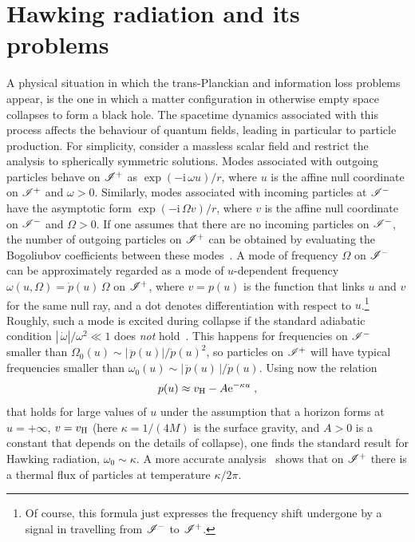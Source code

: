 \documentclass[prd, groupedaddress, showpacs, showkeys, onecolumn, nofootinbib]{revtex4}
\begin{document}
\section{Hawking radiation and its problems}
\label{sec:problems}

A physical situation in which the trans-Planckian and information loss problems appear, is the one in which a matter configuration in otherwise empty space collapses to form a black hole.  The spacetime dynamics associated with this process affects the behaviour of quantum fields, leading in particular to particle production.  For simplicity, consider a massless scalar field and restrict the analysis to spherically symmetric solutions.  Modes associated with outgoing particles behave  on $\mathscr{I}^+$ as $\exp\left(-\mathrm{i}\,\omega u\right)/r$, where $u$ is the affine null coordinate on $\mathscr{I}^{+}$ and $\omega>0$.  Similarly, modes associated with incoming particles at $\mathscr{I}^-$ have the asymptotic form $\exp\left(-\mathrm{i}\,\Omega v\right)/r$, where $v$ is the affine null coordinate on $\mathscr{I}^{-}$ and $\Omega>0$.  If one assumes that there are no incoming particles on $\mathscr{I}^-$, the number of outgoing particles on $\mathscr{I}^+$ can be obtained by evaluating the Bogoliubov coefficients between these modes~\cite{Hawking:1974sw, Birrell:1982ix, Novikov:1989sz}.  A mode of frequency $\Omega$ on $\mathscr{I}^-$ can be approximately regarded as a mode of $u$-dependent frequency $\omega(u,\Omega) = \dot{p}(u)\,\Omega $ on $\mathscr{I}^+$, where $v=p(u)$ is the function that links  $u$ and $v$ for the same null ray, and a dot denotes differentiation with respect to $u$.\footnote{Of course, this formula just expresses the frequency shift undergone by a signal in travelling from $\mathscr{I}^-$ to $\mathscr{I}^+$.}  Roughly, such a mode is excited during collapse if the standard adiabatic condition $|\,\dot{\omega}|/\omega^2\ll 1$ does \emph{not\/} hold~\cite{Barcelo:2007yk}.  This happens for frequencies on $\mathscr{I}^-$ smaller than $\Omega_0(u) \sim |\,\ddot{p}(u)|/\dot{p}(u)^2$, so particles on $\mathscr{I}^+$ will have typical frequencies smaller than $\omega_0(u)\sim |\,\ddot{p}(u)\,|/\dot{p}(u)$.  Using now the relation 
%
\begin{eqnarray}
p(u)\approx v_{\rm H} - A{\mathrm e}^{-\kappa u}\;,
\label{standard-p}
\end{eqnarray}
%
that holds for large values of $u$ under the assumption that a horizon forms at $u=+\infty$, $v=v_{\rm H}$ (here $\kappa=1/(4M)$ is the surface gravity, and $A>0$ is a constant that depends on the details of collapse), one finds the standard result for Hawking radiation, $\omega_0\sim \kappa$.  A more accurate analysis~\cite{Hawking:1974sw, Birrell:1982ix, Novikov:1989sz} shows that on $\mathscr{I}^+$ there is a thermal flux of particles at temperature $\kappa/2\pi$.
\end{document}
